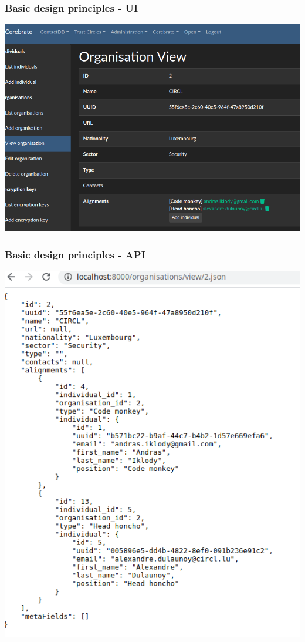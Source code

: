\begin{frame}
\frametitle{Basic design principles - UI}
\begin{center}
    \includegraphics[scale=0.5]{UI.png}
\end{center}
\end{frame}

\begin{frame}
\frametitle{Basic design principles - API}
\begin{center}
    \includegraphics[scale=0.5]{API.png}
\end{center}
\end{frame}

